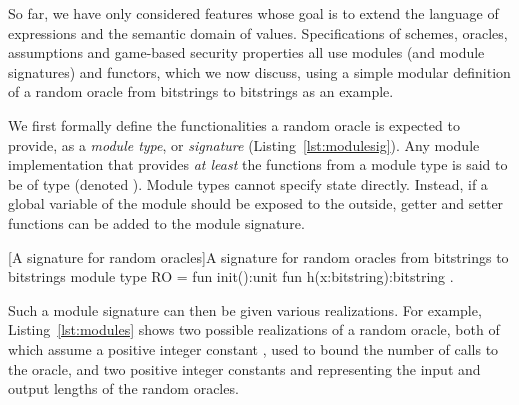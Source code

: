 So far, we have only considered features whose goal is to extend the language of
expressions and the semantic domain of values. Specifications of schemes,
oracles, assumptions and game-based security properties all use modules (and
module signatures) and functors, which we now discuss, using a simple modular
definition of a random oracle from bitstrings to bitstrings as an example.

We first formally define the functionalities a random oracle is expected to
provide, as a \emph{module type}, or \emph{signature}
(Listing~\ref{lst:modulesig}). Any module implementation  that provides
\emph{at least} the functions from a module type  is said to be of
type  (denoted ). Module types cannot specify state
directly. Instead, if a global variable of the module should be exposed to the
outside, getter and setter functions can be added to the module signature.

\begin{easycrypt}[label={lst:modulesig}]{[A signature for random oracles]A signature for random oracles from bitstrings to bitstrings}
module type RO = {
  fun init():unit
  fun h(x:bitstring):bitstring }.
\end{easycrypt}

Such a module signature can then be given various realizations. For example, Listing~\ref{lst:modules} shows two possible realizations of a random oracle, both of which assume a positive integer constant , used to bound the number of calls to the oracle, and two positive integer constants  and  representing the input and output lengths of the random oracles.

